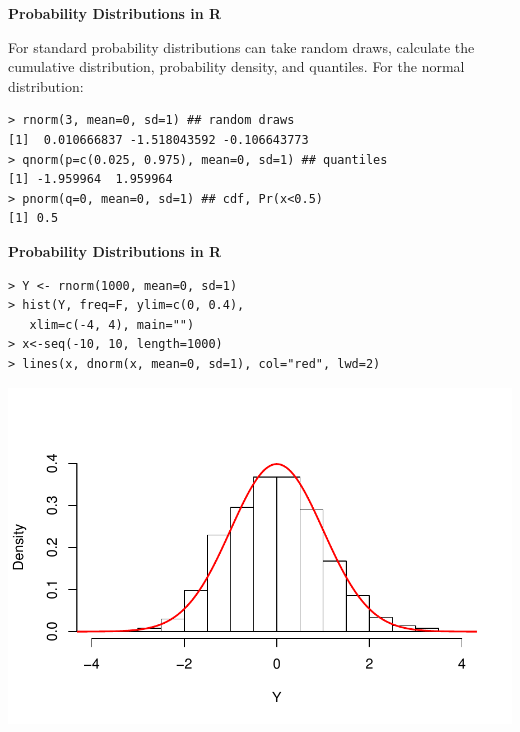 \documentclass[12pt,xcolor=svgnames]{beamer}
\newcommand{\bl}{\color{blue}}
\newcommand{\theme}{\color{FireBrick}}
\newcommand{\sk}{\vspace{.4cm}}
\newcommand{\nsk}{\vspace{-.4cm}}
\newcommand{\chap}[1]{{\theme \Large \bf #1} \sk}
\begin{document}
\begin{frame}[fragile]
\chap{Probability Distributions in {\sf R}}

For standard probability distributions  can take random draws, calculate the cumulative distribution, probability density, and quantiles. For the normal distribution:

{\bl
\begin{verbatim}
> rnorm(3, mean=0, sd=1) ## random draws
[1]  0.010666837 -1.518043592 -0.106643773  
> qnorm(p=c(0.025, 0.975), mean=0, sd=1) ## quantiles
[1] -1.959964  1.959964
> pnorm(q=0, mean=0, sd=1) ## cdf, Pr(x<0.5)
[1] 0.5
\end{verbatim}
}

\end{frame}

\begin{frame}[fragile]
\chap{Probability Distributions in {\sf R}}

\nsk
{\bl
\begin{verbatim}
> Y <- rnorm(1000, mean=0, sd=1) 
> hist(Y, freq=F, ylim=c(0, 0.4), 
   xlim=c(-4, 4), main="")
> x<-seq(-10, 10, length=1000)
> lines(x, dnorm(x, mean=0, sd=1), col="red", lwd=2) 
\end{verbatim}
}

\begin{center}
\includegraphics[scale=0.45,trim=10 40 0 40]{norm_dist}
\end{center}

\end{frame}
\end{document}
